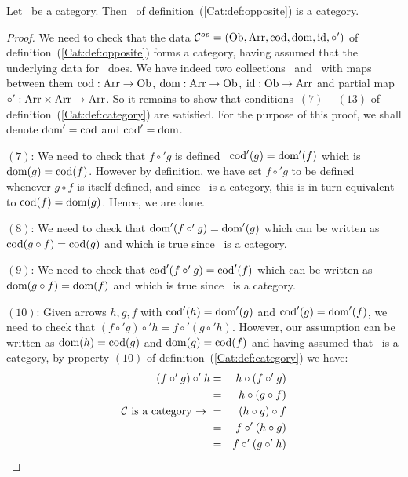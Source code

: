 \begin{prop}\label{Cat:prop:opp:is:category}
    Let \Cat\ be a category. Then \Cop\ of 
    definition~(\ref{Cat:def:opposite}) is a category.
\end{prop}
\begin{proof}
    We need to check that the data $\mbox{${\cal C}^{op}$}=(\mbox{\rm Ob}, \mbox{\rm Arr}, \mbox{\rm cod}, \mbox{\rm dom}, \mbox{\rm id}, \circ')$ 
    of definition~(\ref{Cat:def:opposite}) forms a category, having assumed
    that the underlying data for \Cat\ does. We have indeed two collections 
    \ob\ and \arr\ with maps between them $\mbox{\rm cod}:\mbox{\rm Arr}\to\mbox{\rm Ob}$, $\mbox{\rm dom}:\mbox{\rm Arr}\to\mbox{\rm Ob}$, 
    $\mbox{\rm id}:\mbox{\rm Ob}\to\mbox{\rm Arr}$ and partial map $\circ':\mbox{\rm Arr}\times\mbox{\rm Arr}\to\mbox{\rm Arr}$. So it
    remains to show that conditions~$(7)-(13)$ of 
    definition~(\ref{Cat:def:category}) are satisfied. For the purpose of
    this proof, we shall denote $\mbox{\rm dom}'=\mbox{\rm cod}$ and $\mbox{\rm cod}'=\mbox{\rm dom}$.

    $(7)$: We need to check that $f\circ' g$ is defined \ifand\ 
    $\mbox{\rm cod}'(g)=\mbox{\rm dom}'(f)$ which is $\mbox{\rm dom}(g)=\mbox{\rm cod}(f)$. However by definition, 
    we have set $f\circ' g$ to be defined whenever $g\circ f$ is itself 
    defined, and since \Cat\ is a category, this is in turn equivalent 
    to $\mbox{\rm cod}(f)=\mbox{\rm dom}(g)$. Hence, we are done.

    $(8)$: We need to check that $\mbox{\rm dom}'(f\circ' g)=\mbox{\rm dom}'(g)$ which can be
    written as $\mbox{\rm cod}(g\circ f)=\mbox{\rm cod}(g)$ and which is true since \Cat\ is a
    category.


    $(9)$: We need to check that $\mbox{\rm cod}'(f\circ' g)=\mbox{\rm cod}'(f)$ which can be
    written as $\mbox{\rm dom}(g\circ f)=\mbox{\rm dom}(f)$ and which is true since \Cat\ is a
    category.

    $(10)$: Given arrows $h,g,f$ with $\mbox{\rm cod}'(h)=\mbox{\rm dom}'(g)$ and $\mbox{\rm cod}'(g)=
    \mbox{\rm dom}'(f)$, we need to check that $(f\circ' g)\circ' h= f\circ'(g\circ' h)$.
    However, our assumption can be written as $\mbox{\rm dom}(h)=\mbox{\rm cod}(g)$ and
    $\mbox{\rm dom}(g)=\mbox{\rm cod}(f)$ and having assumed that \Cat\ is a category, by
    property $(10)$ of definition~(\ref{Cat:def:category}) we have:
        \begin{eqnarray*}(f\circ' g)\circ' h 
            &=&h\circ(f\circ' g)\\
            &=&h\circ(g\circ f)\\
            \mbox{\mbox{$\cal C$}\ is a category\ $\to$\ }
            &=&(h\circ g)\circ f\\
            &=&f\circ' (h\circ g)\\
            &=&f\circ' (g\circ' h)
        \end{eqnarray*}


\end{proof}
